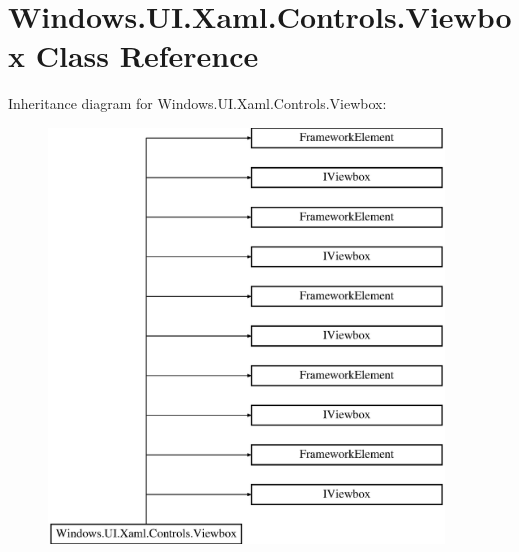 \hypertarget{class_windows_1_1_u_i_1_1_xaml_1_1_controls_1_1_viewbox}{}\section{Windows.\+U\+I.\+Xaml.\+Controls.\+Viewbox Class Reference}
\label{class_windows_1_1_u_i_1_1_xaml_1_1_controls_1_1_viewbox}
Inheritance diagram for Windows.\+U\+I.\+Xaml.\+Controls.\+Viewbox\+:\begin{figure}[H]
\begin{center}
\leavevmode
\includegraphics[height=11.000000cm]{class_windows_1_1_u_i_1_1_xaml_1_1_controls_1_1_viewbox}
\end{center}
\end{figure}
